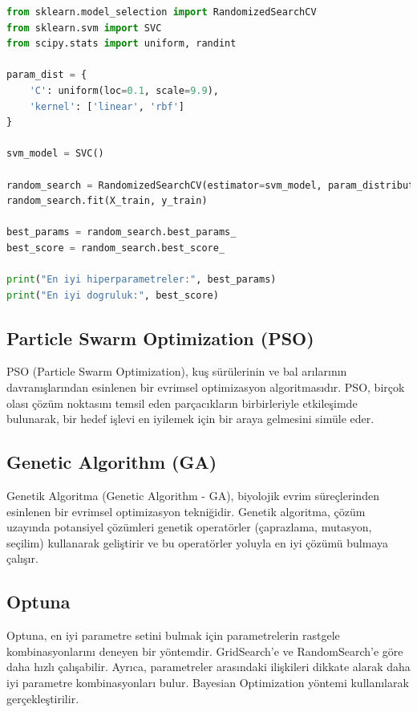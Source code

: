 \begin{lstlisting}[language=Python]
from sklearn.model_selection import RandomizedSearchCV
from sklearn.svm import SVC
from scipy.stats import uniform, randint

param_dist = {
    'C': uniform(loc=0.1, scale=9.9),
    'kernel': ['linear', 'rbf']
}

svm_model = SVC()

random_search = RandomizedSearchCV(estimator=svm_model, param_distributions=param_dist, n_iter=10, cv=5, scoring='accuracy')
random_search.fit(X_train, y_train)

best_params = random_search.best_params_
best_score = random_search.best_score_

print("En iyi hiperparametreler:", best_params)
print("En iyi dogruluk:", best_score)
\end{lstlisting}

\newpage

\subsection{Particle Swarm Optimization (PSO)}
PSO (Particle Swarm Optimization), kuş sürülerinin ve bal arılarının davranışlarından esinlenen bir evrimsel optimizasyon algoritmasıdır.
PSO, birçok olası çözüm noktasını temsil eden parçacıkların birbirleriyle etkileşimde bulunarak, bir hedef işlevi en iyilemek için bir araya gelmesini simüle eder.

\newpage

\subsection{Genetic Algorithm (GA)}
Genetik Algoritma (Genetic Algorithm - GA), biyolojik evrim süreçlerinden esinlenen bir evrimsel optimizasyon tekniğidir. 
Genetik algoritma, çözüm uzayında potansiyel çözümleri genetik operatörler (çaprazlama, mutasyon, seçilim) kullanarak geliştirir 
ve bu operatörler yoluyla en iyi çözümü bulmaya çalışır. 

\newpage

\subsection{Optuna}
Optuna, en iyi parametre setini bulmak için parametrelerin rastgele kombinasyonlarını deneyen bir yöntemdir. GridSearch'e ve RandomSearch'e göre daha hızlı çalışabilir. Ayrıca, parametreler arasındaki ilişkileri dikkate alarak daha iyi parametre kombinasyonları bulur. Bayesian Optimization yöntemi kullanılarak gerçekleştirilir.

